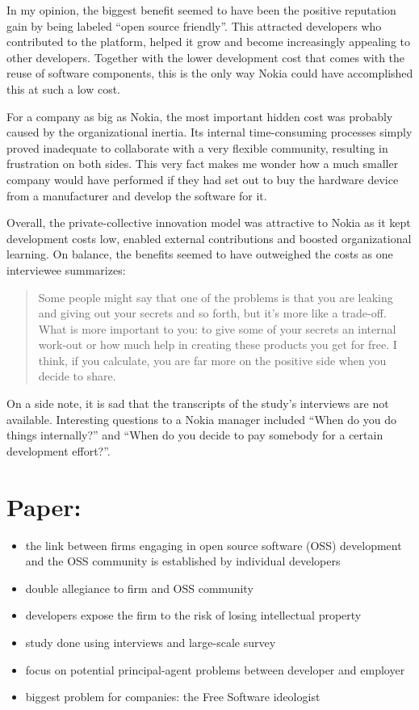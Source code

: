 \documentclass[a4paper]{scrartcl}
\begin{document}
In my opinion, the biggest benefit seemed to have been the positive reputation gain by being labeled ``open source friendly''.
This attracted developers who contributed to the platform, helped it grow and become increasingly appealing to other developers.
Together with the lower development cost that comes with the reuse of software components, this is the only way Nokia could have accomplished this at such a low cost.

For a company as big as Nokia, the most important hidden cost was probably caused by the organizational inertia.
Its internal time-consuming processes simply proved inadequate to collaborate with a very flexible community, resulting in frustration on both sides. 
This very fact makes me wonder how a much smaller company would have performed if they had set out to buy the hardware device from a manufacturer and develop the software for it. 

Overall, the private-collective innovation model was attractive to Nokia as it kept development costs low, enabled external contributions and boosted organizational learning.
On balance, the benefits seemed to have outweighed the costs as one interviewee summarizes:

\begin{quotation}
Some people might say that one of the problems
is that you are leaking and giving out
your secrets and so forth, but it’s more like a
trade-off. What is more important to you: to
give some of your secrets an internal work-out
or how much help in creating these products
you get for free. I think, if you calculate, you
are far more on the positive side when you
decide to share.
\end{quotation}

On a side note, it is sad that the transcripts of the study's interviews are not available. Interesting questions to a Nokia manager included ``When do you do things internally?'' and  ``When do you decide to pay somebody for a certain development effort?''.

\section{Paper: }

\begin{itemize}
\item the link between firms engaging in open source software (OSS) development and the OSS community is established by individual developers 
\item double allegiance to firm and OSS community
\item developers expose the firm to the risk of losing intellectual property
\item study done using interviews and large-scale survey
\item focus on potential principal-agent problems between developer and employer
\item biggest problem for companies: the Free Software ideologist
\end{itemize}
\end{document}
